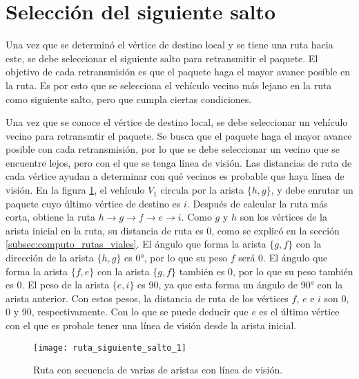 \section{Selección del siguiente salto}
\label{subsec:seleccion_siguiente_salto}

Una vez que se determinó el vértice de destino local y se tiene una ruta hacia
este, se debe seleccionar el siguiente salto para retransmitir el paquete. El
objetivo de cada retransmisión es que el paquete haga el mayor avance posible en
la ruta. Es por esto que se selecciona el vehículo vecino  más lejano en la ruta
como siguiente salto, pero que cumpla ciertas condiciones.


Una vez que se conoce el vértice de destino local, se debe seleccionar un
vehículo vecino para retransmtir el paquete. Se busca que el paquete haga el
mayor avance posible con cada retransmisión, por lo que se debe seleccionar un
vecino que se encuentre lejos, pero con el que se tenga línea de visión. Las
distancias de ruta de cada vértice ayudan a determinar con qué vecinos es
probable que haya línea de visión. En la figura
\ref{fig:ruta_siguiente_salto_1}, el vehículo $V_1$ circula por la arista
$\{h,g\}$, y debe enrutar un paquete cuyo último vértice de destino es $i$.
Después de calcular la ruta más corta, obtiene la ruta $h \rightarrow g
\rightarrow f \rightarrow e \rightarrow i$. Como $g$ y $h$ son los vértices de
la arista inicial en la ruta, su distancia de ruta es 0, como se explicó en la
sección \ref{subsec:computo_rutas_viales}. El ángulo que forma la arista
$\{g,f\}$ con la dirección de la arista $\{h,g\}$ es 0\si{\degree}, por lo que su
peso $f$ será 0. El ángulo que forma la arista $\{f,e\}$ con la arista
$\{g,f\}$ también es 0, por lo que su peso también es 0. El peso de la arista
$\{e,i\}$ es 90, ya que esta forma un ángulo de 90\si{\degree} con la arista
anterior. Con estos pesos, la distancia de ruta de los vértices $f$, $e$ e $i$
son 0, 0 y 90, respectivamente. Con lo que se puede deducir que $e$ es el
último vértice con el que es probale tener una línea de visión desde la arista
inicial.

\begin{figure}[th!]
\centering
\texttt{[image: ruta\_siguiente\_salto\_1]}
\decoRule
\caption[Ruta con secuencia de varias aristas con línea de visión]{Ruta con
secuencia de varias de aristas con línea de visión.}
\label{fig:ruta_siguiente_salto_1}
\end{figure}

